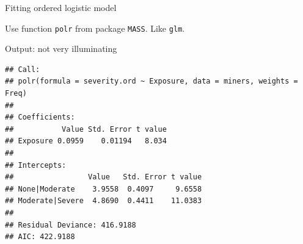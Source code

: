 \begin{frame}[fragile]{Fitting ordered logistic model}

Use function \texttt{polr} from package \texttt{MASS}. Like \texttt{glm}.

{\small
 
\begin{knitrout}
\color{fgcolor}\begin{kframe}
\begin{alltt}
\end{alltt}


{\ttfamily\noindent\itshape\color{messagecolor}{\#\# \\\#\# Attaching package: 'MASS'}}

{\ttfamily\noindent\itshape\color{messagecolor}{\#\# The following object is masked from 'package:dplyr':\\\#\# \\\#\#\ \ \ \  select}}\begin{alltt}
\hlkwb{=}\hlopt{~}
\end{alltt}
\end{kframe}
\end{knitrout}
}
  
\end{frame}

\begin{frame}[fragile]{Output: not very illuminating}
  
\begin{knitrout}
\color{fgcolor}\begin{kframe}
\begin{alltt}
\end{alltt}


{\ttfamily\noindent\itshape\color{messagecolor}{\#\# \\\#\# Re-fitting to get Hessian}}\begin{verbatim}
## Call:
## polr(formula = severity.ord ~ Exposure, data = miners, weights = Freq)
## 
## Coefficients:
##           Value Std. Error t value
## Exposure 0.0959    0.01194   8.034
## 
## Intercepts:
##                 Value   Std. Error t value
## None|Moderate    3.9558  0.4097     9.6558
## Moderate|Severe  4.8690  0.4411    11.0383
## 
## Residual Deviance: 416.9188 
## AIC: 422.9188
\end{verbatim}
\end{kframe}
\end{knitrout}
  
\end{frame}
 
